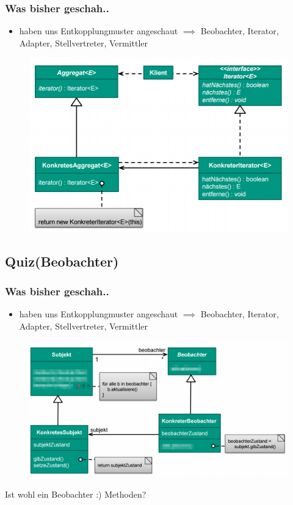 \documentclass[18pt]{beamer}
\begin{document}
	\begin{frame}
		\frametitle{Was bisher geschah..}
		\begin{itemize}
			\item haben uns Entkopplungmuster angeschaut
			\linebreak $\implies$ Beobachter, Iterator, Adapter, Stellvertreter, Vermittler
		\end{itemize}
		\begin{figure}
			\includegraphics[scale=0.35]{./pics/tut3/iter.png}
		\end{figure}
	\end{frame}
	
	\subsection{Quiz(Beobachter)}
	
	\begin{frame}
		\frametitle{Was bisher geschah..}
		\begin{itemize}
			\item haben uns Entkopplungmuster angeschaut
			\linebreak $\implies$ Beobachter, Iterator, Adapter, Stellvertreter, Vermittler
		\end{itemize}
		\begin{figure}
			\includegraphics[scale=0.25]{./pics/tut4/obs-mod.png}
		\end{figure}
		\pause Ist wohl ein Beobachter :) \pause Methoden?
	\end{frame}
	
\end{document}
